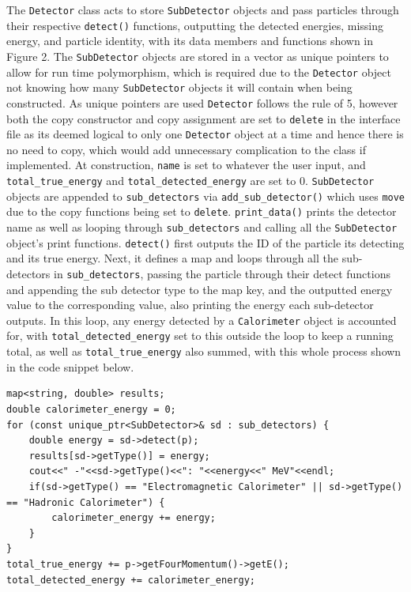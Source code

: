 \documentclass[12pt]{report}
\begin{document}
The \texttt{Detector} class acts to store \texttt{SubDetector} objects and pass particles through their respective \texttt{detect()} functions, outputting the detected energies, missing energy, and particle identity, with its data members and functions shown in Figure 2. The \texttt{SubDetector} objects are stored in a vector as unique pointers to allow for run time polymorphism, which is required due to the \texttt{Detector} object not knowing how many \texttt{SubDetector} objects it will contain when being constructed. As unique pointers are used \texttt{Detector} follows the rule of 5, however both the copy constructor and copy assignment are set to \texttt{delete} in the interface file as its deemed logical to only one \texttt{Detector} object at a time and hence there is no need to copy, which would add unnecessary complication to the class if implemented. At construction, \texttt{name} is set to whatever the user input, and \texttt{total\_true\_energy} and \texttt{total\_detected\_energy} are set to 0. \texttt{SubDetector} objects are appended to \texttt{sub\_detectors} via \texttt{add\_sub\_detector()} which uses \texttt{move} due to the copy functions being set to \texttt{delete}. \texttt{print\_data()} prints the detector name as well as looping through \texttt{sub\_detectors} and calling all the \texttt{SubDetector} object's print functions. \texttt{detect()} first outputs the ID of the particle its detecting and its true energy. Next, it defines a map and loops through all the sub-detectors in \texttt{sub\_detectors}, passing the particle through their detect functions and appending the sub detector type to the map key, and the outputted energy value to the corresponding value, also printing the energy each sub-detector outputs. In this loop, any energy detected by a \texttt{Calorimeter} object is accounted for, with \texttt{total\_detected\_energy} set to this outside the loop to keep a running total, as well as \texttt{total\_true\_energy} also summed, with this whole process shown in the code snippet below. 
\begin{verbatim}
map<string, double> results;
double calorimeter_energy = 0;
for (const unique_ptr<SubDetector>& sd : sub_detectors) {
    double energy = sd->detect(p);
    results[sd->getType()] = energy;
    cout<<" -"<<sd->getType()<<": "<<energy<<" MeV"<<endl;
    if(sd->getType() == "Electromagnetic Calorimeter" || sd->getType() == "Hadronic Calorimeter") {
        calorimeter_energy += energy;
    }
}
total_true_energy += p->getFourMomentum()->getE();
total_detected_energy += calorimeter_energy;
\end{verbatim}
\end{document}
